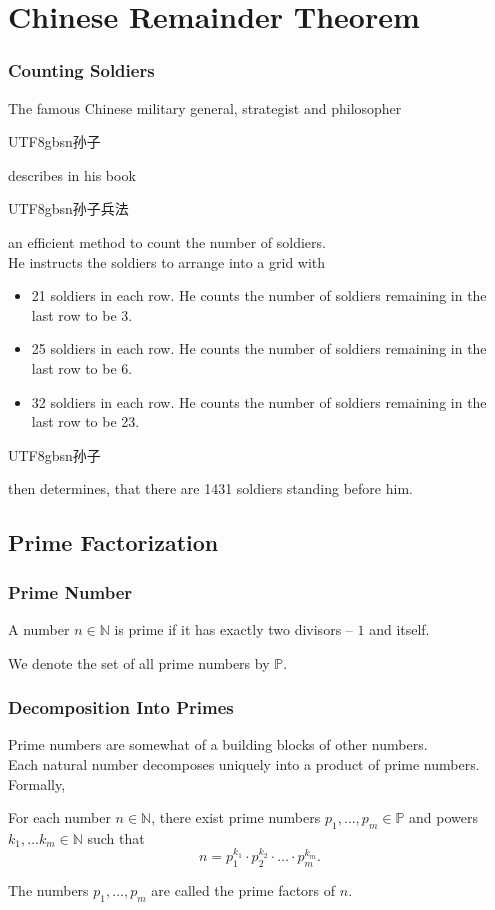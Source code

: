 \documentclass[aspectratio=169,11pt,usenames,dvipsnames,handout]{beamer}
\newcommand{\zh}[1]{\begin{CJK}{UTF8}{gbsn}#1\end{CJK}}
\newcommand{\N}{\mathbb{N}}
\renewcommand{\P}{\mathbb{P}}
\begin{document}
\section{Chinese Remainder Theorem}

\begin{frame}
 \frametitle{Counting Soldiers}
 The famous Chinese military general, strategist and philosopher \zh{孙子}
 describes in his book \zh{孙子兵法} an efficient method to count the number of
 soldiers.\\
 \pause
 He instructs the soldiers to arrange into a grid with
 \begin{itemize}
  \item 21 soldiers in each row. He counts the number of soldiers remaining in
   the last row to be 3.
  \pause
  \item 25 soldiers in each row. He counts the number of soldiers remaining in
   the last row to be 6.
  \pause
  \item 32 soldiers in each row. He counts the number of soldiers remaining in
   the last row to be 23.
 \end{itemize}
 \pause
 \zh{孙子} then determines, that there are 1431 soldiers standing before him.
\end{frame}

\subsection{Prime Factorization}

\begin{frame}
 \subsectionpage
\end{frame}

\begin{frame}
 \frametitle{Prime Number}
 \begin{tcolorbox}[title=Prime Number]
  A number $n \in \N$ is \alert{prime} if it has \alert{exactly two divisors} --
  $1$ and itself.

  We denote the set of all prime numbers by $\mathbb{P}$.
 \end{tcolorbox}
\end{frame}

\begin{frame}
 \frametitle{Decomposition Into Primes}
 Prime numbers are somewhat of a building blocks of other numbers.\\
 \pause
 Each natural number decomposes \alert{uniquely} into a product of prime
 numbers.\\
 \pause
 Formally,
 \begin{tcolorbox}[title=Prime Factorization]
  For each number $n \in \N$, there exist prime numbers $p_1,\ldots,p_m \in \P$ and
  powers $k_1,\ldots k_m \in \N$ such that
  \[
   n = p_1^{k_1} \cdot p_2^{k_2} \cdot \ldots \cdot p_m^{k_m}.
  \]
 \end{tcolorbox}
 \pause
 The numbers $p_1,\ldots,p_m$ are called the \alert{prime factors} of $n$.
\end{frame}
\end{document}
